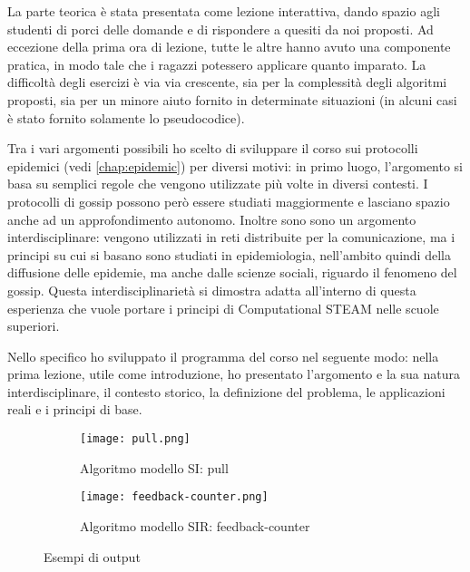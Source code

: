 La parte teorica è stata presentata come lezione interattiva, dando spazio agli studenti di porci delle domande e di rispondere a quesiti da noi proposti. Ad eccezione della prima ora di lezione, tutte le altre hanno avuto una componente pratica, in modo tale che i ragazzi potessero applicare quanto imparato. La difficoltà degli esercizi è via via crescente, sia per la complessità degli algoritmi proposti, sia per un minore aiuto fornito in determinate situazioni (in alcuni casi è stato fornito solamente lo pseudocodice). 

Tra i vari argomenti possibili ho scelto di sviluppare il corso sui protocolli epidemici (vedi \autoref{chap:epidemic}) per diversi motivi: in primo luogo, l’argomento si basa su semplici regole che vengono utilizzate più volte in diversi contesti. I protocolli di gossip possono però essere studiati maggiormente e lasciano spazio anche ad un approfondimento autonomo. Inoltre sono sono un argomento interdisciplinare: vengono utilizzati in reti distribuite per la comunicazione, ma i principi su cui si basano sono studiati in epidemiologia, nell’ambito quindi della diffusione delle epidemie, ma anche dalle scienze sociali, riguardo il fenomeno del gossip. Questa interdisciplinarietà si dimostra adatta all’interno di questa esperienza che vuole portare i principi di Computational STEAM nelle scuole superiori.

Nello specifico ho sviluppato il programma del corso nel seguente modo: nella prima lezione, utile come introduzione, ho presentato l’argomento e la sua natura interdisciplinare, il contesto storico, la definizione del problema, le applicazioni reali e i principi di base.
\begin{figure}[!ht]
    
    \begin{subfigure}{.5\textwidth}
        \centering
        \texttt{[image: pull.png]}
        \captionsetup{justification=centering}
        \caption{Algoritmo modello SI: pull} 
    \end{subfigure}\hfill
    \begin{subfigure}{.5\textwidth}
        \centering
        \texttt{[image: feedback-counter.png]}
        \captionsetup{justification=centering}
        \caption{Algoritmo modello SIR: feedback-counter} 
    \end{subfigure}
    \caption{Esempi di output}
    \label{fig:output}
\end{figure} 

